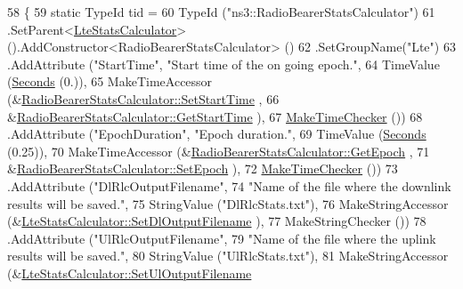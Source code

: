 \begin{DoxyCode}
58 \{
59   \textcolor{keyword}{static} TypeId tid =
60     TypeId (\textcolor{stringliteral}{"ns3::RadioBearerStatsCalculator"})
61     .SetParent<\hyperlink{classns3_1_1LteStatsCalculator_a4d74204c35bb226063fb38662072b272}{LteStatsCalculator}> ().AddConstructor<RadioBearerStatsCalculator> ()
62     .SetGroupName(\textcolor{stringliteral}{"Lte"})
63     .AddAttribute (\textcolor{stringliteral}{"StartTime"}, \textcolor{stringliteral}{"Start time of the on going epoch."}, 
64                    TimeValue (\hyperlink{group__timecivil_ga33c34b816f8ff6628e33d5c8e9713b9e}{Seconds} (0.)),
65                    MakeTimeAccessor (&\hyperlink{classns3_1_1RadioBearerStatsCalculator_aa2eddec79377156e7653f9d5be97d10e}{RadioBearerStatsCalculator::SetStartTime}
      ,
66                                      &\hyperlink{classns3_1_1RadioBearerStatsCalculator_a9d9957895037d6a4af2f1d28c354bc46}{RadioBearerStatsCalculator::GetStartTime}
      ), 
67                    \hyperlink{group__time_ga7032965bd4afa578691d88c09e4481c1}{MakeTimeChecker} ())
68     .AddAttribute (\textcolor{stringliteral}{"EpochDuration"}, \textcolor{stringliteral}{"Epoch duration."}, 
69                    TimeValue (\hyperlink{group__timecivil_ga33c34b816f8ff6628e33d5c8e9713b9e}{Seconds} (0.25)), 
70                    MakeTimeAccessor (&\hyperlink{classns3_1_1RadioBearerStatsCalculator_a503dff119965e0b1555bad3bb47fbad2}{RadioBearerStatsCalculator::GetEpoch}
      ,
71                                      &\hyperlink{classns3_1_1RadioBearerStatsCalculator_afe72ec59fb25163dad6c3b47abcb0a32}{RadioBearerStatsCalculator::SetEpoch}
      ), 
72                    \hyperlink{group__time_ga7032965bd4afa578691d88c09e4481c1}{MakeTimeChecker} ())
73     .AddAttribute (\textcolor{stringliteral}{"DlRlcOutputFilename"},
74                    \textcolor{stringliteral}{"Name of the file where the downlink results will be saved."},
75                    StringValue (\textcolor{stringliteral}{"DlRlcStats.txt"}),
76                    MakeStringAccessor (&\hyperlink{classns3_1_1LteStatsCalculator_a1cd704e00a2384ef49fa74a7d29f91c1}{LteStatsCalculator::SetDlOutputFilename}
      ),
77                    MakeStringChecker ())
78     .AddAttribute (\textcolor{stringliteral}{"UlRlcOutputFilename"},
79                    \textcolor{stringliteral}{"Name of the file where the uplink results will be saved."},
80                    StringValue (\textcolor{stringliteral}{"UlRlcStats.txt"}),
81                    MakeStringAccessor (&\hyperlink{classns3_1_1LteStatsCalculator_a47ced91f91ab7550e347ee1a933ca998}{LteStatsCalculator::SetUlOutputFilename}

\end{DoxyCode}
